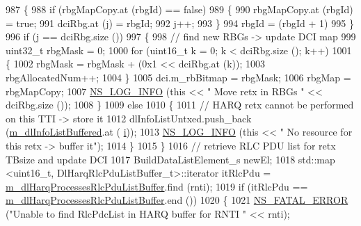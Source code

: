 \begin{DoxyCode}
987                 \{
988                   \textcolor{keywordflow}{if} (rbgMapCopy.at (rbgId) == \textcolor{keyword}{false})
989                     \{
990                       rbgMapCopy.at (rbgId) = \textcolor{keyword}{true};
991                       dciRbg.at (j) = rbgId;
992                       j++;
993                     \}
994                   rbgId = (rbgId + 1) %
995                 \}
996               \textcolor{keywordflow}{if} (j == dciRbg.size ())
997                 \{
998                   \textcolor{comment}{// find new RBGs -> update DCI map}
999                   uint32\_t rbgMask = 0;
1000                   \textcolor{keywordflow}{for} (uint16\_t k = 0; k < dciRbg.size (); k++)
1001                     \{
1002                       rbgMask = rbgMask + (0x1 << dciRbg.at (k));
1003                       rbgAllocatedNum++;
1004                     \}
1005                   dci.m\_rbBitmap = rbgMask;
1006                   rbgMap = rbgMapCopy;
1007                   \hyperlink{group__logging_gafbd73ee2cf9f26b319f49086d8e860fb}{NS\_LOG\_INFO} (\textcolor{keyword}{this} << \textcolor{stringliteral}{" Move retx in RBGs "} << dciRbg.size ());
1008                 \}
1009               \textcolor{keywordflow}{else}
1010                 \{
1011                   \textcolor{comment}{// HARQ retx cannot be performed on this TTI -> store it}
1012                   dlInfoListUntxed.push\_back (\hyperlink{classns3_1_1TdTbfqFfMacScheduler_aabf2460c78d16c5202cdcda020ba06dd}{m\_dlInfoListBuffered}.at (
      \hyperlink{bernuolliDistribution_8m_a6f6ccfcf58b31cb6412107d9d5281426}{i}));
1013                   \hyperlink{group__logging_gafbd73ee2cf9f26b319f49086d8e860fb}{NS\_LOG\_INFO} (\textcolor{keyword}{this} << \textcolor{stringliteral}{" No resource for this retx -> buffer it"});
1014                 \}
1015             \}
1016           \textcolor{comment}{// retrieve RLC PDU list for retx TBsize and update DCI}
1017           BuildDataListElement\_s newEl;
1018           std::map <uint16\_t, DlHarqRlcPduListBuffer\_t>::iterator itRlcPdu =  
      \hyperlink{classns3_1_1TdTbfqFfMacScheduler_a997b6649f2a69dd389d9a4381707b755}{m\_dlHarqProcessesRlcPduListBuffer}.find (rnti);
1019           \textcolor{keywordflow}{if} (itRlcPdu == \hyperlink{classns3_1_1TdTbfqFfMacScheduler_a997b6649f2a69dd389d9a4381707b755}{m\_dlHarqProcessesRlcPduListBuffer}.end ())
1020             \{
1021               \hyperlink{group__fatal_ga5131d5e3f75d7d4cbfd706ac456fdc85}{NS\_FATAL\_ERROR} (\textcolor{stringliteral}{"Unable to find RlcPdcList in HARQ buffer for RNTI "} << rnti);

\end{DoxyCode}
